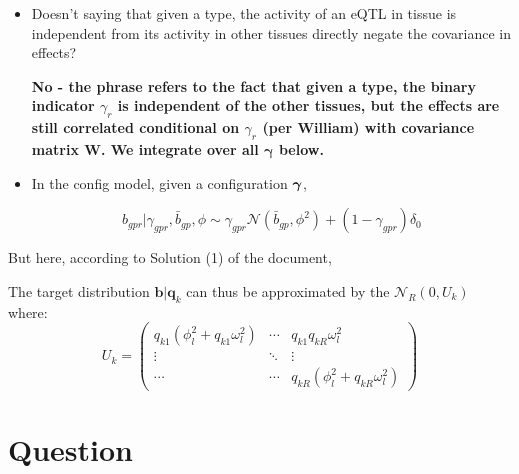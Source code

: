 \documentclass[10pt]{article}
\newcommand{\Norm}{{\mathcal{N}}} %
\newcommand{\gav}{\mbox{\boldmath$\gamma$}}
\begin{document}
\begin{itemize}

\item Doesn't saying that given a type, the activity of an eQTL in tissue is independent from its activity in other tissues directly negate the covariance in effects?

\textbf {No - the phrase refers to the fact that given a type, the binary indicator $\gamma_{r}$ is independent of the other tissues, but the effects are still correlated conditional on $\gamma_{r}$ (per William) with covariance matrix $\mathbf W$. We integrate over all $\mathbf \gamma$ below.}

\item In the config model, given a configuration $\gav$, 

\begin{equation}
  b_{gpr} | \gamma_{gpr}, \bar{b}_{gp}, \phi \sim \gamma_{gpr} \Norm(\bar{b}_{gp}, \phi^2) + (1 - \gamma_{gpr}) \delta_0
\end{equation}

\end{itemize}

But here, according to Solution (1) of the document, 

The target distribution $\bm{b} | \bm{q}_k$ can thus be approximated by the $\Norm_R(0,U_k)$ where:
\[
U_k = 
\begin{pmatrix}
  q_{k1} (\phi_l^2 + q_{k1} \omega_l^2) & \cdots & q_{k1} q_{kR} \omega_l^2 \\
  \vdots & \ddots & \vdots \\
  \cdots & \cdots & q_{kR} (\phi_l^2 + q_{kR} \omega_l^2)
\end{pmatrix}
\]







\section{Question}
\end{document}
